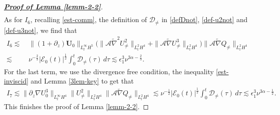 \documentclass[11pt,reqno]{article}
\numberwithin{equation}{section}
\newcommand\D{{\mathcal D}}
\newcommand\E{{\mathcal E}}
\newcommand\A{\mathcal{A}}
\newcommand\U{\bm{U}}
\let\pa=\partial
\let\al=\alpha
\let\f=\frac
\let\ep=\epsilon
\begin{document}
\begin{proof}[\underline{\textbf{Proof of Lemma \ref{lemm-2-2}}}]
\begin{align*}
\end{align*}
As for $I_6$, recalling \eqref{est-comm}, the definition of $\D_{\neq}$ in \eqref{defDnot}, \eqref{def-u2not} and \eqref{def-u3not}, we find that
\begin{align*}
	I_6
	\lesssim&~
	\|(1+\pa_{z})\U_{0}\|_{L^\infty_tH^5}
	\big(\|\A \widetilde{\nabla}^2U_{\not=}^2\|_{L^2_tH^4}
	+\|\A \widetilde{\nabla}U_{\not=}^3\|_{L^2_tH^4}\big)
	\|\A\widetilde{\nabla}Q_{\not=}\|_{L^2_tH^4}
	\\
	\lesssim&~ \nu^{-\f23} |\E_{0}(t)|^{\f12} \int_0^t\D_{\not=}(\tau)\,d\tau
	\lesssim  \ep_1^3\nu^{3\al-\f23}.
\end{align*}
For the last term, we use the 
divergence free condition, the inequality \eqref{est-inviscid} and Lemma \ref{3lem-key} to get that
\begin{align*}
	I_7
	\lesssim
	\|\pa_{z}\nabla U_{0}^3\|_{L^\infty_tH^4}
	\| U_{\not=}^2\|_{L^2_tH^4}
	\|\A\widetilde{\nabla}Q_{\not=}\|_{L^2_tH^4}
	\lesssim \nu^{-\f12} |\E_{0}(t)|^{\f12} \int_0^t\D_{\not=}(\tau)\,d\tau
	\lesssim  \ep_1^3\nu^{3\al-\f12}.
\end{align*}
This finishes the proof of Lemma \ref{lemm-2-2}.

\end{proof}
\end{document}
